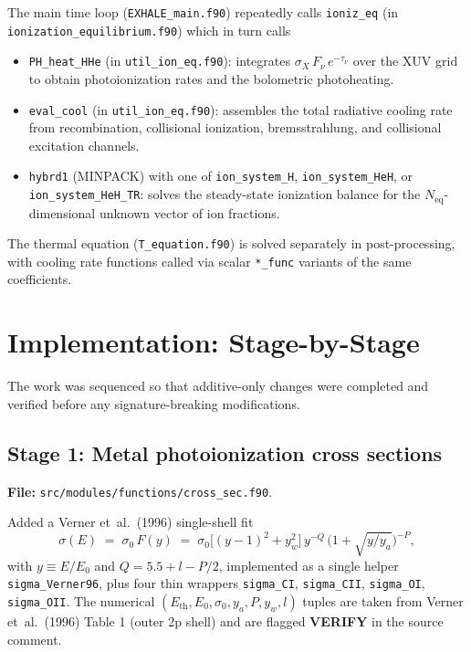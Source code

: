 \documentclass[english,a4paper]{my_memo}
\begin{document}
The main time loop (\texttt{EXHALE\_main.f90}) repeatedly calls
\texttt{ioniz\_eq} (in \texttt{ionization\_equilibrium.f90}) which in
turn calls
\begin{itemize}
  \item \texttt{PH\_heat\_HHe} (in \texttt{util\_ion\_eq.f90}): integrates
    \(\sigma_X\, F_\nu\, e^{-\tau_\nu}\) over the XUV grid to obtain
    photoionization rates and the bolometric photoheating.
  \item \texttt{eval\_cool} (in \texttt{util\_ion\_eq.f90}): assembles
    the total radiative cooling rate from recombination, collisional
    ionization, bremsstrahlung, and collisional excitation channels.
  \item \texttt{hybrd1} (MINPACK) with one of \texttt{ion\_system\_H},
    \texttt{ion\_system\_HeH}, or \texttt{ion\_system\_HeH\_TR}: solves
    the steady-state ionization balance for the
    \(N_{\mathrm{eq}}\)-dimensional unknown vector of ion fractions.
\end{itemize}

The thermal equation (\texttt{T\_equation.f90}) is solved separately
in post-processing, with cooling rate functions called via scalar
\texttt{*\_func} variants of the same coefficients.

\section{Implementation: Stage-by-Stage}

The work was sequenced so that additive-only changes were completed
and verified before any signature-breaking modifications.

\subsection{Stage 1: Metal photoionization cross sections}
\textbf{File:} \texttt{src/modules/functions/cross\_sec.f90}.

Added a Verner et~al.~(1996) single-shell fit
\[
  \sigma(E) \;=\; \sigma_0\,F(y) \;=\;
  \sigma_0\bigl[(y-1)^{2} + y_w^{2}\bigr]\,y^{-Q}\,
  \bigl(1 + \sqrt{y/y_a}\bigr)^{-P},
\]
with \(y \equiv E/E_0\) and \(Q = 5.5 + l - P/2\), implemented as a
single helper \texttt{sigma\_Verner96}, plus four thin wrappers
\texttt{sigma\_CI}, \texttt{sigma\_CII}, \texttt{sigma\_OI},
\texttt{sigma\_OII}.  The numerical
\((E_{\mathrm{th}}, E_0, \sigma_0, y_a, P, y_w, l)\) tuples are taken
from Verner et~al.~(1996) Table 1 (outer 2p shell) and are flagged
\textbf{VERIFY} in the source comment.
\end{document}

